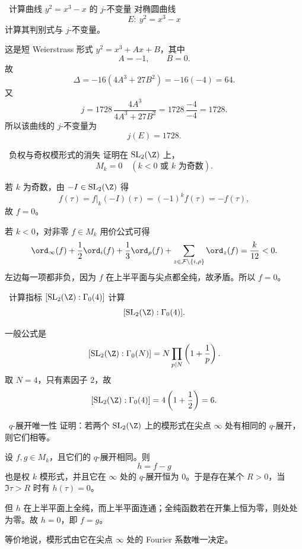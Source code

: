 \begin{problem}{\easy\ 计算曲线 $y^2=x^3-x$ 的 $j$-不变量}
对椭圆曲线
\[
E:\ y^2=x^3-x
\]
计算其判别式与 $j$-不变量。
\end{problem}
\begin{solution}
这是短 Weierstrass 形式 $y^2=x^3+Ax+B$，其中
\[
A=-1,\qquad B=0.
\]
故
\[
\Delta=-16(4A^3+27B^2)=-16(-4)=64.
\]
又
\[
j=1728\,\frac{4A^3}{4A^3+27B^2}
=1728\,\frac{-4}{-4}
=1728.
\]
所以该曲线的 $j$-不变量为
\[
j(E)=1728.
\]
\end{solution}

\begin{problem}{\easy\ 负权与奇权模形式的消失}
证明在 $\mathrm{SL}_2(\Z)$ 上，
\[
M_k=0\quad (k<0 \text{ 或 } k \text{ 为奇数}).
\]
\end{problem}
\begin{solution}
若 $k$ 为奇数，由 $-I\in \mathrm{SL}_2(\Z)$ 得
\[
f(\tau)=f|_k(-I)(\tau)=(-1)^k f(\tau)=-f(\tau),
\]
故 $f=0$。

若 $k<0$，对非零 $f\in M_k$ 用价公式可得
\[
\ord_\infty(f)+\frac12\ord_i(f)+\frac13\ord_\rho(f)
+\sum_{z\in \mathcal F\setminus\{i,\rho\}}\ord_z(f)=\frac{k}{12}<0.
\]
左边每一项都非负，因为 $f$ 在上半平面与尖点都全纯，故矛盾。所以 $f=0$。
\end{solution}

\begin{problem}{\easy\ 计算指标 $[\mathrm{SL}_2(\Z):\Gamma_0(4)]$}
计算
\[
[\mathrm{SL}_2(\Z):\Gamma_0(4)].
\]
\end{problem}
\begin{solution}
一般公式是
\[
[\mathrm{SL}_2(\Z):\Gamma_0(N)]
= N\prod_{p\mid N}\left(1+\frac1p\right).
\]
取 $N=4$，只有素因子 $2$，故
\[
[\mathrm{SL}_2(\Z):\Gamma_0(4)]
=4\left(1+\frac12\right)=6.
\]
\end{solution}

\begin{problem}{\easy\ $q$-展开唯一性}
证明：若两个 $\mathrm{SL}_2(\Z)$ 上的模形式在尖点 $\infty$ 处有相同的 $q$-展开，则它们相等。
\end{problem}
\begin{solution}
设 $f,g\in M_k$，且它们的 $q$-展开相同。则
\[
h=f-g
\]
也是权 $k$ 模形式，并且它在 $\infty$ 处的 $q$-展开恒为 $0$。于是存在某个 $R>0$，当 $\Im\tau>R$ 时有 $h(\tau)=0$。

但 $h$ 在上半平面上全纯，而上半平面连通；全纯函数若在开集上恒为零，则处处为零。故 $h=0$，即 $f=g$。

等价地说，模形式由它在尖点 $\infty$ 处的 Fourier 系数唯一决定。
\end{solution}

